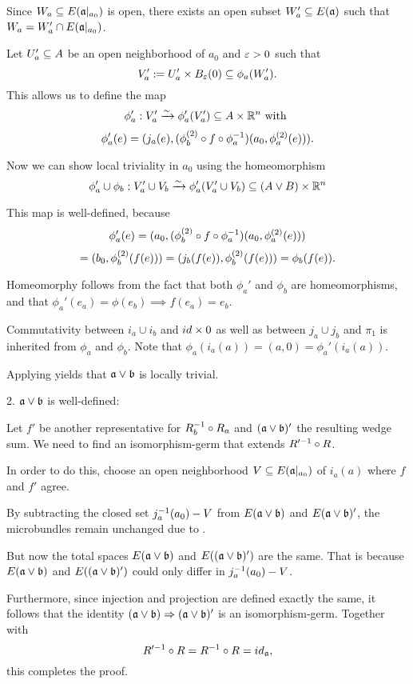 \begin{myproof}
\begin{enumerate}
        Since $W_a \subseteq{} E(\mathfrak{a}\vert_{a_0})$ is open,
        there exists an open subset
        $W_a' \subseteq{} E(\mathfrak{a})$ such that $W_a = W_a' \cap E(\mathfrak{a}\vert_{a_0})$.

        Let $U_a' \subseteq{} A$ be an open neighborhood of $a_0$ and $\varepsilon{} > 0$ such that
        \[ V_a' := U_a' \cross \ball[\eps] \sub \phi_a(W_a'). \]
        This allows us to define the map
        \[ \phi_a': V_a' \xrightarrow{\sim} \phi_a'(V_a') \subseteq{} A \times \mathbb{R}^n \text{ with } \]
        \[ \phi_a'(e) = (j_a(e), (\phi_b^{(2)} \circ f \circ \phi_a^{-1})(a_0, \phi_a^{(2)}(e))). \]

        Now we can show local triviality in $a_0$ using the homeomorphism
        \[ \phi_a' \cup \phi_b: V_a' \cup V_b \xrightarrow{\sim} \phi_a'(V_a' \cup V_b) \subseteq{} (A \vee B) \times \mathbb{R}^n \]

        This map is well-defined, because
        \[ \phi_a'(e) = (a_0, (\phi_b^{(2)} \circ f \circ \phi_a^{-1})(a_0, \phi_a^{(2)}(e))) \]
        \[ = (b_0, \phi_b^{(2)}(f(e))) = (j_b(f(e)), \phi_b^{(2)}(f(e))) = \phi_b(f(e)). \]

        Homeomorphy follows from the fact
        that both $\phi_a'$ and $\phi_b$ are homeomorphisms,
        and that $\phi_a'(e_a) = \phi(e_b) \implies f(e_a) = e_b$. 

        Commutativity between $i_a \cup i_b$ and $id \times 0$
        as well as between $j_a \cup j_b$ and $\pi_1$
        is inherited from $\phi_a$ and $\phi_b$.
        Note that $\phi_a(i_a(a)) = (a, 0) = \phi_a'(i_a(a))$.

        Applying  yields that $\ba \vee \bb$ is locally trivial.
    \end{enumerate}
    
    2. $\ba \vee \bb$ is well-defined:

    Let $f'$ be another representative for $R_b^{-1} \circ R_a$ and $(\ba \vee \bb)'$ the resulting wedge sum.
    We need to find an isomorphism-germ that extends $R'^{-1} \circ R$.
    
    In order to do this,
    choose an open neighborhood $V \subseteq{} E(\mathfrak{a}\vert_{a_0})$
    of $i_a(a)$ where $f$ and $f'$ agree.
    
    By subtracting the closed set $j_a^{-1}(a_0) - V$
    from $E(\ba \vee \bb)$ and $E(\ba \vee \bb)'$,
    the microbundles remain unchanged due to .
    
    But now the total spaces $E(\ba \vee \bb)$ and $E((\ba \vee \bb)')$ are the same.
    That is because $E(\ba \vee \bb)$ and $E((\ba \vee \bb)')$
    could only differ in $j_a^{-1}(a_0) - V$.

    
    Furthermore, since injection and projection are defined exactly the same,
    it follows that the identity $\germ{(\ba \vee \bb)}{(\ba \vee \bb)'}$
    is an isomorphism-germ.
    Together with
    \[ R'^{-1} \circ R = R^{-1} \circ R = id_{\mathfrak{a}}, \]
    this completes the proof.
\end{myproof}